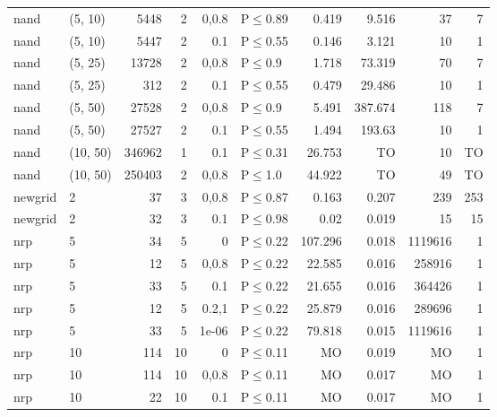 \begin{longtable}{llrrrlrrrr}
 nand          & (5, 10)  &   	5448 &   2 & 0,0.8 & P$\leq$0.89  & 0.419   & 9.516   & 37      & 7    \\
 nand          & (5, 10)  &   	5447 &   2 & 0.1   & P$\leq$0.55  & 0.146   & 3.121   & 10      & 1    \\
 nand          & (5, 25)  &  	13728 &   2 & 0,0.8 & P$\leq$0.9   & 1.718   & 73.319  & 70      & 7    \\
 nand          & (5, 25)  &    	312 &   2 & 0.1   & P$\leq$0.55  & 0.479   & 29.486  & 10      & 1    \\
 nand          & (5, 50)  &  	27528 &   2 & 0,0.8 & P$\leq$0.9   & 5.491   & 387.674 & 118     & 7    \\
 nand          & (5, 50)  &  	27527 &   2 & 0.1   & P$\leq$0.55  & 1.494   & 193.63  & 10      & 1    \\
 nand          & (10, 50) & 	346962 &   1 & 0.1   & P$\leq$0.31  & 26.753  & TO      & 10      & TO   \\
 nand          & (10, 50) & 	250403 &   2 & 0,0.8 & P$\leq$1.0   & 44.922  & TO      & 49      & TO   \\
 newgrid       & 2        &     	37 &   3 & 0,0.8 & P$\leq$0.87  & 0.163   & 0.207   & 239     & 253  \\
 newgrid       & 2        &     	32 &   3 & 0.1   & P$\leq$0.98  & 0.02    & 0.019   & 15      & 15   \\
 nrp           & 5        &     	34 &   5 & 0     & P$\leq$0.22  & 107.296 & 0.018   & 1119616 & 1    \\
 nrp           & 5        &     	12 &   5 & 0,0.8 & P$\leq$0.22  & 22.585  & 0.016   & 258916  & 1    \\
 nrp           & 5        &     	33 &   5 & 0.1   & P$\leq$0.22  & 21.655  & 0.016   & 364426  & 1    \\
 nrp           & 5        &     	12 &   5 & 0.2,1 & P$\leq$0.22  & 25.879  & 0.016   & 289696  & 1    \\
 nrp           & 5        &     	33 &   5 & 1e-06 & P$\leq$0.22  & 79.818  & 0.015   & 1119616 & 1    \\
 nrp           & 10       &    	114 &  10 & 0     & P$\leq$0.11  & MO      & 0.019   & MO      & 1    \\
 nrp           & 10       &    	114 &  10 & 0,0.8 & P$\leq$0.11  & MO      & 0.017   & MO      & 1    \\
 nrp           & 10       &     	22 &  10 & 0.1   & P$\leq$0.11  & MO      & 0.017   & MO      & 1    \\

\end{longtable}
